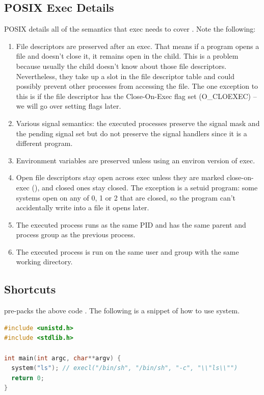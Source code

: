 \subsection{POSIX Exec Details}

POSIX details all of the semantics that exec needs to cover \cite{exec_2018}.
Note the following:

\begin{enumerate}
\item File descriptors are preserved after an exec. That means if a program opens a file and doesn't close it, it remains open in the child.
  This is a problem because usually the child doesn't know about those file descriptors. Nevertheless, they take up a slot in the file descriptor table and could possibly prevent other processes from accessing the file.
  The one exception to this is if the file descriptor has the Close-On-Exec flag set (O\_CLOEXEC) -- we will go over setting flags later.
\item Various signal semantics: the executed processes preserve the signal mask and the pending signal set but do not preserve the signal handlers since it is a different program.
\item Environment variables are preserved unless using an environ version of exec.
\item Open file descriptors stay open across exec unless they are marked close-on-exec (), and closed ones stay closed. The exception is a setuid program: some systems open  on any of 0, 1 or 2 that are closed, so the program can't accidentally write into a file it opens later.
\item The executed process runs as the same PID and has the same parent and process group as the previous process.
\item The executed process is run on the same user and group with the same working directory.
\end{enumerate}

\subsection{Shortcuts}

 pre-packs the above code \cite[P. 371]{jones2010wg14}.
The following is a snippet of how to use system.

\begin{lstlisting}[language=C]
#include <unistd.h>
#include <stdlib.h>

int main(int argc, char**argv) {
  system("ls"); // execl("/bin/sh", "/bin/sh", "-c", "\\"ls\\"")
  return 0;
}
\end{lstlisting}

